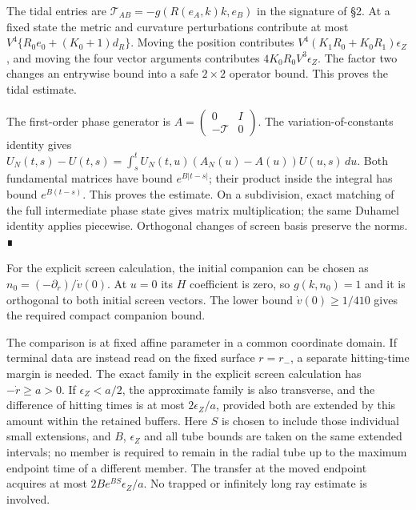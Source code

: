 \documentclass[
  english,
  11pt,
  reqno]{amsart}
\begin{document}
The tidal entries are \(\mathcal T_{AB}=-g(R(e_A,k)k,e_B)\) in the
signature of §2. At a fixed state the metric and curvature perturbations
contribute at most \(V^4\{R_0e_0+(K_0+1)d_R\}\). Moving the position
contributes \(V^4(K_1R_0+K_0R_1)\epsilon_Z\), and moving the four vector
arguments contributes \(4K_0R_0V^3\epsilon_Z\). The factor two changes
an entrywise bound into a safe \(2\times2\) operator bound. This proves
the tidal estimate.

The first-order phase generator is
\(A=\left(\begin{smallmatrix}0&I\\-\mathcal T&0\end{smallmatrix}\right)\).
The variation-of-constants identity gives
\(U_N(t,s)-U(t,s)=\int_s^tU_N(t,u)(A_N(u)-A(u))U(u,s)\,du\). Both
fundamental matrices have bound \(e^{B|t-s|}\); their product inside the
integral has bound \(e^{B(t-s)}\). This proves the estimate. On a
subdivision, exact matching of the full intermediate phase state gives
matrix multiplication; the same Duhamel identity applies piecewise.
Orthogonal changes of screen basis preserve the norms. ∎

For the explicit screen calculation, the initial companion can be chosen
as \(n_0=(-\partial_r)/\dot v(0)\). At \(u=0\) its \(H\) coefficient is
zero, so \(g(k,n_0)=1\) and it is orthogonal to both initial screen
vectors. The lower bound \(\dot v(0)\ge1/410\) gives the required
compact companion bound.

The comparison is at fixed affine parameter in a common coordinate
domain. If terminal data are instead read on the fixed surface
\(r=r_-\), a separate hitting-time margin is needed. The exact family in
the explicit screen calculation has \(-\dot r\ge a>0\). If
\(\epsilon_Z<a/2\), the approximate family is also transverse, and the
difference of hitting times is at most \(2\epsilon_Z/a\), provided both
are extended by this amount within the retained buffers. Here \(S\) is
chosen to include those individual small extensions, and \(B\),
\(\epsilon_Z\) and all tube bounds are taken on the same extended
intervals; no member is required to remain in the radial tube up to the
maximum endpoint time of a different member. The transfer at the moved
endpoint acquires at most \(2Be^{BS}\epsilon_Z/a\). No trapped or
infinitely long ray estimate is involved.
\end{document}
